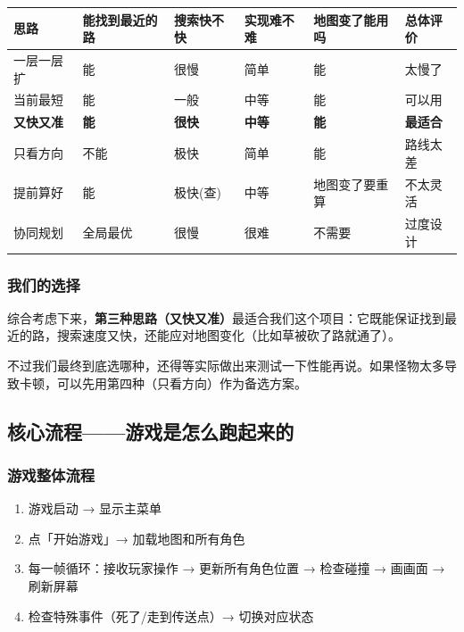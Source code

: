 \documentclass[12pt,a4paper]{article}
\begin{document}
\begin{table}[htbp]
\centering
\renewcommand{\arraystretch}{1.4}
\begin{tabularx}{\textwidth}{lXXXXX}
\toprule
\textbf{思路} & \textbf{能找到最近的路} & \textbf{搜索快不快} & \textbf{实现难不难} & \textbf{地图变了能用吗} & \textbf{总体评价} \\
\midrule
一层一层扩 & 能 & 很慢 & 简单 & 能 & 太慢了 \\
当前最短 & 能 & 一般 & 中等 & 能 & 可以用 \\
\textbf{又快又准} & \textbf{能} & \textbf{很快} & \textbf{中等} & \textbf{能} & \textbf{最适合} \\
只看方向 & 不能 & 极快 & 简单 & 能 & 路线太差 \\
提前算好 & 能 & 极快(查) & 中等 & 地图变了要重算 & 不太灵活 \\
协同规划 & 全局最优 & 很慢 & 很难 & 不需要 & 过度设计 \\
\bottomrule
\end{tabularx}
\end{table}

\subsubsection{我们的选择}

综合考虑下来，\textbf{第三种思路（又快又准）}最适合我们这个项目：它既能保证找到最近的路，搜索速度又快，还能应对地图变化（比如草被砍了路就通了）。

不过我们最终到底选哪种，还得等实际做出来测试一下性能再说。如果怪物太多导致卡顿，可以先用第四种（只看方向）作为备选方案。

\subsection{核心流程——游戏是怎么跑起来的}

\subsubsection{游戏整体流程}

\begin{enumerate}[leftmargin=2em]
    \item 游戏启动 → 显示主菜单
    \item 点「开始游戏」→ 加载地图和所有角色
    \item 每一帧循环：接收玩家操作 → 更新所有角色位置 → 检查碰撞 → 画画面 → 刷新屏幕
    \item 检查特殊事件（死了/走到传送点）→ 切换对应状态
\end{enumerate}
\end{document}

